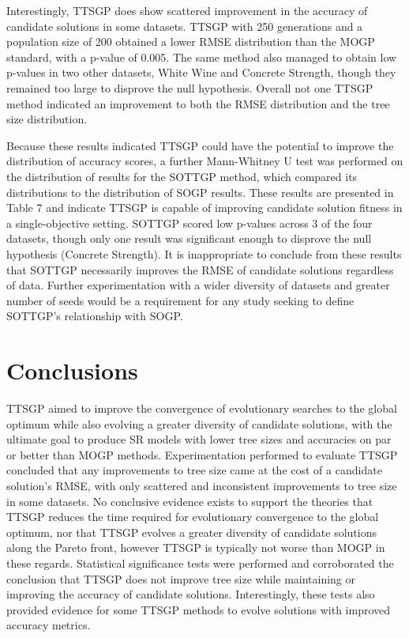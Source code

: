 \documentclass[a4paper, twocolumn]{article}
\begin{document}
Interestingly, TTSGP does show scattered improvement in the accuracy of candidate solutions in some datasets. TTSGP with 250 generations and a population size of 200 obtained a lower RMSE distribution than the MOGP standard, with a p-value of 0.005. The same method also managed to obtain low p-values in two other datasets, White Wine and Concrete Strength, though they remained too large to disprove the null hypothesis. Overall not one TTSGP method indicated an improvement to both the RMSE distribution and the tree size distribution.

Because these results indicated TTSGP could have the potential to improve the distribution of accuracy scores, a further Mann-Whitney U test was performed on the distribution of results for the SOTTGP method, which compared its distributions to the distribution of SOGP results. These results are presented in Table 7 and indicate TTSGP is capable of improving candidate solution fitness in a single-objective setting. SOTTGP scored low p-values across 3 of the four datasets, though only one result was significant enough to disprove the null hypothesis (Concrete Strength). It is inappropriate to conclude from these results that SOTTGP necessarily improves the RMSE of candidate solutions regardless of data. Further experimentation with a wider diversity of datasets and greater number of seeds would be a requirement for any study seeking to define SOTTGP's relationship with SOGP.

\section{Conclusions}
TTSGP aimed to improve the convergence of evolutionary searches to the global optimum while also evolving a greater diversity of candidate solutions, with the ultimate goal to produce SR models with lower tree sizes and accuracies on par or better than MOGP methods. Experimentation performed to evaluate TTSGP concluded that any improvements to tree size came at the cost of a candidate solution's RMSE, with only scattered and inconsistent improvements to tree size in some datasets. No conclusive evidence exists to support the theories that TTSGP reduces the time required for evolutionary convergence to the global optimum, nor that TTSGP evolves a greater diversity of candidate solutions along the Pareto front, however TTSGP is typically not worse than MOGP in these regards. Statistical significance tests were performed and corroborated the conclusion that TTSGP does not improve tree size while maintaining or improving the accuracy of candidate solutions. Interestingly, these tests also provided evidence for some TTSGP methods to evolve solutions with improved accuracy metrics.
\end{document}

